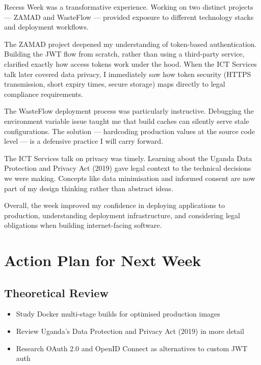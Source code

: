 \documentclass[12pt,a4paper]{article}
\begin{document}
Recess Week was a transformative experience. Working on two distinct projects --- ZAMAD and WasteFlow --- provided exposure to different technology stacks and deployment workflows.

The ZAMAD project deepened my understanding of token-based authentication. Building the JWT flow from scratch, rather than using a third-party service, clarified exactly how access tokens work under the hood. When the ICT Services talk later covered data privacy, I immediately saw how token security (HTTPS transmission, short expiry times, secure storage) maps directly to legal compliance requirements.

The WasteFlow deployment process was particularly instructive. Debugging the environment variable issue taught me that build caches can silently serve stale configurations. The solution --- hardcoding production values at the source code level --- is a defensive practice I will carry forward.

The ICT Services talk on privacy was timely. Learning about the Uganda Data Protection and Privacy Act (2019) gave legal context to the technical decisions we were making. Concepts like data minimisation and informed consent are now part of my design thinking rather than abstract ideas.

Overall, the week improved my confidence in deploying applications to production, understanding deployment infrastructure, and considering legal obligations when building internet-facing software.

\section{Action Plan for Next Week}
\label{sec:action_plan}

\subsection{Theoretical Review}
\begin{itemize}
    \item Study Docker multi-stage builds for optimised production images
    \item Review Uganda's Data Protection and Privacy Act (2019) in more detail
    \item Research OAuth 2.0 and OpenID Connect as alternatives to custom JWT auth
\end{itemize}
\end{document}
